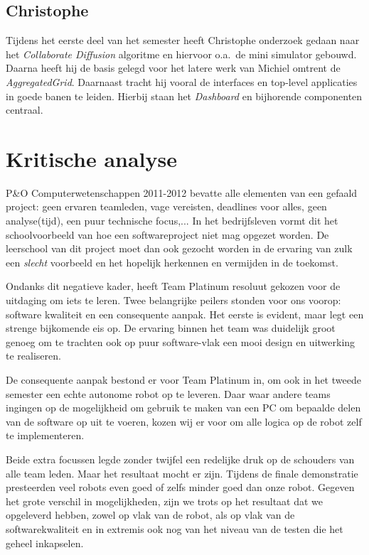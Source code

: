 \documentclass[12pt,a4paper]{report}
\begin{document}
\section{Christophe}

Tijdens het eerste deel van het semester heeft Christophe onderzoek gedaan naar het \emph{Collaborate Diffusion} algoritme en hiervoor o.a.\ de mini simulator gebouwd. Daarna heeft hij de basis gelegd voor het latere werk van Michiel omtrent de \emph{AggregatedGrid}. Daarnaast tracht hij vooral de interfaces en top-level applicaties in goede banen te leiden. Hierbij staan het \emph{Dashboard} en bijhorende componenten centraal.

\chapter{Kritische analyse}

P\&O Computerwetenschappen 2011-2012 bevatte alle elementen van een gefaald project: geen ervaren teamleden, vage vereisten, deadlines voor alles, geen analyse(tijd), een puur technische focus,... In het bedrijfsleven vormt dit het schoolvoorbeeld van hoe een softwareproject niet mag opgezet worden. De leerschool van dit project moet dan ook gezocht worden in de ervaring van zulk een \emph{slecht} voorbeeld en het hopelijk herkennen en vermijden in de toekomst.

Ondanks dit negatieve kader, heeft Team Platinum resoluut gekozen voor de uitdaging om iets te leren. Twee belangrijke peilers stonden voor ons voorop: software kwaliteit en een consequente aanpak. Het eerste is evident, maar legt een strenge bijkomende eis op. De ervaring binnen het team was duidelijk groot genoeg om te trachten ook op puur software-vlak een mooi design en uitwerking te realiseren.

De consequente aanpak bestond er voor Team Platinum in, om ook in het tweede semester een echte autonome robot op te leveren. Daar waar andere teams ingingen op de mogelijkheid om gebruik te maken van een PC om bepaalde delen van de software op uit te voeren, kozen wij er voor om alle logica op de robot zelf te implementeren.

Beide extra focussen legde zonder twijfel een redelijke druk op de schouders van alle team leden. Maar het resultaat mocht er zijn. Tijdens de finale demonstratie presteerden veel robots even goed of zelfs minder goed dan onze robot. Gegeven het grote verschil in mogelijkheden, zijn we trots op het resultaat dat we opgeleverd hebben, zowel op vlak van de robot, als op vlak van de softwarekwaliteit en in extremis ook nog van het niveau van de testen die het geheel inkapselen.
\end{document}
